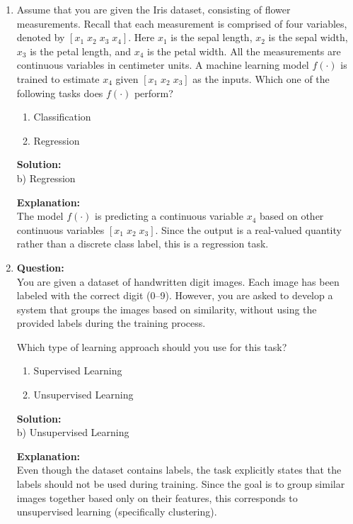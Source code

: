 \documentclass{article}
\begin{document}
\begin{enumerate}

\item Assume that you are given the Iris dataset, consisting of flower measurements. Recall that each measurement is comprised of four variables, denoted by \([x_1\; x_2\; x_3\; x_4]\). Here \(x_1\) is the sepal length, \(x_2\) is the sepal width, \(x_3\) is the petal length, and \(x_4\) is the petal width. All the measurements are continuous variables in centimeter units. A machine learning model \(f(\cdot)\) is trained to estimate \(x_4\) given \([x_1\; x_2\; x_3]\) as the inputs. Which one of the following tasks does \(f(\cdot)\) perform?

\begin{enumerate}
    \item Classification
    \item Regression
\end{enumerate}

\textbf{Solution:} \\
b) Regression

\textbf{Explanation:} \\
The model \(f(\cdot)\) is predicting a continuous variable \(x_4\) based on other continuous variables \([x_1\; x_2\; x_3]\). Since the output is a real-valued quantity rather than a discrete class label, this is a regression task.

\item \textbf{Question:} \\
You are given a dataset of handwritten digit images. Each image has been labeled with the correct digit (0–9). However, you are asked to develop a system that groups the images based on similarity, without using the provided labels during the training process.

Which type of learning approach should you use for this task?

\begin{enumerate}
    \item Supervised Learning
    \item Unsupervised Learning
\end{enumerate}

\textbf{Solution:} \\
b) Unsupervised Learning

\textbf{Explanation:} \\
Even though the dataset contains labels, the task explicitly states that the labels should not be used during training. Since the goal is to group similar images together based only on their features, this corresponds to unsupervised learning (specifically clustering).


\end{enumerate}
\end{document}
